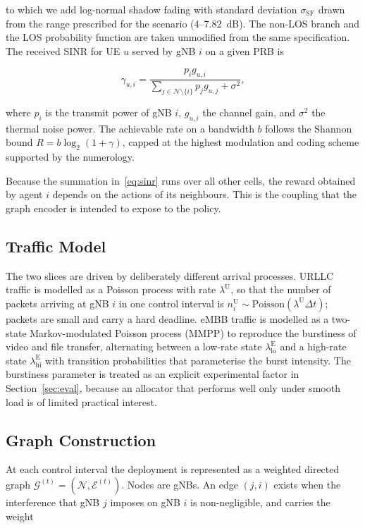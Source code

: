 \documentclass[journal]{IEEEtran}
\begin{document}
to which we add log-normal shadow fading with standard deviation
$\sigma_{\mathrm{SF}}$ drawn from the range prescribed for the scenario
(4--7.82~dB). The non-LOS branch and the LOS probability function are
taken unmodified from the same specification. The received SINR for UE
$u$ served by gNB $i$ on a given PRB is

\begin{equation}
\gamma_{u,i} =
\frac{p_i g_{u,i}}
     {\displaystyle\sum_{j \in \mathcal{N}\setminus\{i\}} p_j g_{u,j} + \sigma^2},
\label{eq:sinr}
\end{equation}

where $p_i$ is the transmit power of gNB $i$, $g_{u,i}$ the channel
gain, and $\sigma^2$ the thermal noise power. The achievable rate on a
bandwidth $b$ follows the Shannon bound
$R = b\log_2(1+\gamma)$, capped at the highest modulation and coding
scheme supported by the numerology.

Because the summation in~\eqref{eq:sinr} runs over all other cells, the
reward obtained by agent $i$ depends on the actions of its neighbours.
This is the coupling that the graph encoder is intended to expose to
the policy.

\subsection{Traffic Model}
The two slices are driven by deliberately different arrival processes.
URLLC traffic is modelled as a Poisson process with rate
$\lambda^{\mathrm{U}}$, so that the number of packets arriving at gNB
$i$ in one control interval is
$n_i^{\mathrm{U}} \sim \mathrm{Poisson}(\lambda^{\mathrm{U}}\Delta t)$;
packets are small and carry a hard deadline. eMBB traffic is modelled
as a two-state Markov-modulated Poisson process (MMPP) to reproduce the
burstiness of video and file transfer, alternating between a low-rate
state $\lambda^{\mathrm{E}}_{\mathrm{lo}}$ and a high-rate state
$\lambda^{\mathrm{E}}_{\mathrm{hi}}$ with transition probabilities that
parameterise the burst intensity. The burstiness parameter is treated
as an explicit experimental factor in Section~\ref{sec:eval}, because
an allocator that performs well only under smooth load is of limited
practical interest.

\subsection{Graph Construction}
At each control interval the deployment is represented as a weighted
directed graph $\mathcal{G}^{(t)} = (\mathcal{N},\mathcal{E}^{(t)})$.
Nodes are gNBs. An edge $(j,i)$ exists when the interference that gNB
$j$ imposes on gNB $i$ is non-negligible, and carries the weight
\end{document}
